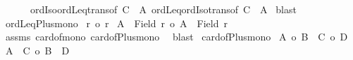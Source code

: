 \begin{isabellebody}
\ \ \ \ \ \ ordIso{\isacharunderscore}{\kern0pt}ordLeq{\isacharunderscore}{\kern0pt}trans{\isacharbrackleft}{\kern0pt}of\ {\isachardoublequoteopen}{\isacharbar}{\kern0pt}C\ {\isacharless}{\kern0pt}{\isacharplus}{\kern0pt}{\isachargreater}{\kern0pt}\ A{\isacharbar}{\kern0pt}{\isachardoublequoteclose}{\isacharbrackright}{\kern0pt}\ ordLeq{\isacharunderscore}{\kern0pt}ordIso{\isacharunderscore}{\kern0pt}trans{\isacharbrackleft}{\kern0pt}of\ {\isachardoublequoteopen}{\isacharbar}{\kern0pt}C\ {\isacharless}{\kern0pt}{\isacharplus}{\kern0pt}{\isachargreater}{\kern0pt}\ A{\isacharbar}{\kern0pt}{\isachardoublequoteclose}{\isacharbrackright}{\kern0pt}\isanewline
{}\isamarkupfalse%
\ blast%
\endisatagproof
{\isafoldproof}%
%
\isadelimproof
\isanewline
%
\endisadelimproof
\isanewline
{}\isamarkupfalse%
\ ordLeq{\isacharunderscore}{\kern0pt}Plus{\isacharunderscore}{\kern0pt}mono{}{\isacharcolon}{\kern0pt}\isanewline
{}\ {\isachardoublequoteopen}r\ {\isasymle}o\ r{\isacharprime}{\kern0pt}{\isachardoublequoteclose}\isanewline
{}\ {\isachardoublequoteopen}{\isacharbar}{\kern0pt}A\ {\isacharless}{\kern0pt}{\isacharplus}{\kern0pt}{\isachargreater}{\kern0pt}\ {\isacharparenleft}{\kern0pt}Field\ r{\isacharparenright}{\kern0pt}{\isacharbar}{\kern0pt}\ {\isasymle}o\ {\isacharbar}{\kern0pt}A\ {\isacharless}{\kern0pt}{\isacharplus}{\kern0pt}{\isachargreater}{\kern0pt}\ {\isacharparenleft}{\kern0pt}Field\ r{\isacharprime}{\kern0pt}{\isacharparenright}{\kern0pt}{\isacharbar}{\kern0pt}{\isachardoublequoteclose}\isanewline
%
\isadelimproof
%
\endisadelimproof
%
\isatagproof
{}\isamarkupfalse%
\ assms\ card{\isacharunderscore}{\kern0pt}of{\isacharunderscore}{\kern0pt}mono{}\ card{\isacharunderscore}{\kern0pt}of{\isacharunderscore}{\kern0pt}Plus{\isacharunderscore}{\kern0pt}mono{}\ \isamarkupfalse%
\ blast%
\endisatagproof
{\isafoldproof}%
%
\isadelimproof
\isanewline
%
\endisadelimproof
\isanewline
{}\isamarkupfalse%
\ card{\isacharunderscore}{\kern0pt}of{\isacharunderscore}{\kern0pt}Plus{\isacharunderscore}{\kern0pt}mono{\isacharcolon}{\kern0pt}\isanewline
{}\ {\isachardoublequoteopen}{\isacharbar}{\kern0pt}A{\isacharbar}{\kern0pt}\ {\isasymle}o\ {\isacharbar}{\kern0pt}B{\isacharbar}{\kern0pt}{\isachardoublequoteclose}\ \ {\isachardoublequoteopen}{\isacharbar}{\kern0pt}C{\isacharbar}{\kern0pt}\ {\isasymle}o\ {\isacharbar}{\kern0pt}D{\isacharbar}{\kern0pt}{\isachardoublequoteclose}\isanewline
{}\ {\isachardoublequoteopen}{\isacharbar}{\kern0pt}A\ {\isacharless}{\kern0pt}{\isacharplus}{\kern0pt}{\isachargreater}{\kern0pt}\ C{\isacharbar}{\kern0pt}\ {\isasymle}o\ {\isacharbar}{\kern0pt}B\ {\isacharless}{\kern0pt}{\isacharplus}{\kern0pt}{\isachargreater}{\kern0pt}\ D{\isacharbar}{\kern0pt}{\isachardoublequoteclose}\isanewline

\end{isabellebody}
